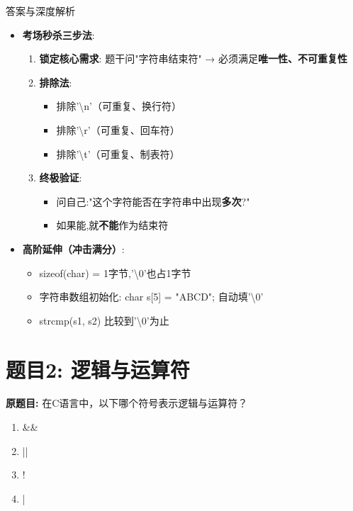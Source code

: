\documentclass[a4paper,12pt]{article}
\begin{document}
\begin{bluebox}{答案与深度解析}
\begin{itemize}[leftmargin=*, nosep]
		\item \textbf{考场秒杀三步法}:
		      \begin{enumerate}
			      \item \textbf{锁定核心需求}: 题干问"字符串结束符" → 必须满足\textbf{唯一性、不可重复性}
			      \item \textbf{排除法}:
			            \begin{itemize}
				            \item 排除'\textbackslash n'（可重复、换行符）
				            \item 排除'\textbackslash r'（可重复、回车符）
				            \item 排除'\textbackslash t'（可重复、制表符）
			            \end{itemize}
			      \item \textbf{终极验证}:
			            \begin{itemize}
				            \item 问自己:"这个字符能否在字符串中出现\textbf{多次}?"
				            \item 如果能,就\textbf{不能}作为结束符
			            \end{itemize}
		      \end{enumerate}

		\item \textbf{高阶延伸（冲击满分）}:
		      \begin{itemize}
			      \item sizeof(char) = 1字节,'\textbackslash0'也占1字节
			      \item 字符串数组初始化: char s[5] = "ABCD"; 自动填'\textbackslash0'
			      \item strcmp(s1, s2) 比较到'\textbackslash0'为止
		      \end{itemize}
	\end{itemize}
\end{bluebox}

\vspace{1cm}

\section*{题目2: 逻辑与运算符}

\textbf{原题目:}
在C语言中，以下哪个符号表示逻辑与运算符？
\begin{enumerate}
	\item[A)] \&\&
	\item[B)] ||
	\item[C)] !
	\item[D)] |
\end{enumerate}
\end{document}

